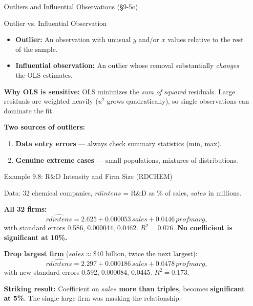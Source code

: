 \documentclass[aspectratio=169, 12pt]{beamer}
\begin{document}
\begin{frame}[shrink=5]{Outliers and Influential Observations (\S9-5c)}

  \begin{definitionbox}{Outlier vs. Influential Observation}
    \begin{itemize}\setlength{\itemsep}{2pt}
      \item \textbf{Outlier:} An observation with unusual $y$ and/or $x$ values relative to
      the rest of the sample.
      \item \textbf{Influential observation:} An outlier whose removal substantially
      \emph{changes} the OLS estimates.
    \end{itemize}
  \end{definitionbox}

  \begin{keybox}
    \textbf{Why OLS is sensitive:} OLS minimizes the \emph{sum of squared} residuals. Large
    residuals are weighted heavily ($u^2$ grows quadratically), so single observations can
    dominate the fit.
  \end{keybox}

  \textbf{Two sources of outliers:}
  \begin{enumerate}\setlength{\itemsep}{1pt}
    \item \textbf{Data entry errors} — always check summary statistics (min, max).
    \item \textbf{Genuine extreme cases} — small populations, mixtures of distributions.
  \end{enumerate}

\end{frame}

\begin{frame}[shrink=5]{Example 9.8: R\&D Intensity and Firm Size (RDCHEM)}

  Data: 32 chemical companies, $\mathit{rdintens}$ = R\&D as \% of sales, $\mathit{sales}$ in millions.

  \medskip
  \textbf{All 32 firms:}
  \[
    \widehat{rdintens} = 2.625 + 0.000053\,sales + 0.0446\,profmarg,
  \]
  with standard errors 0.586, 0.000044, 0.0462. $R^2 = 0.076$. \textbf{No coefficient is
  significant at 10\%.}

  \medskip
  \textbf{Drop largest firm} ($sales \approx \$40$ billion, twice the next largest):
  \[
    \widehat{rdintens} = 2.297 + 0.000186\,sales + 0.0478\,profmarg,
  \]
  with new standard errors 0.592, 0.000084, 0.0445. $R^2 = 0.173$.

  \begin{highlightbox}
    \textbf{Striking result:} Coefficient on $\mathit{sales}$ \textbf{more than triples}, becomes
    \textbf{significant at 5\%}. The single large firm was masking the relationship.
  \end{highlightbox}

\end{frame}
\end{document}
